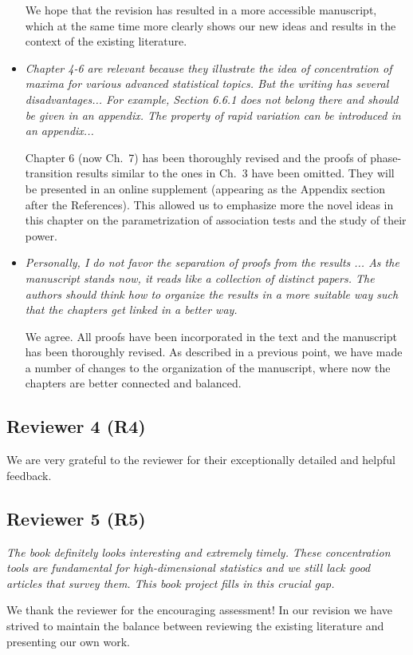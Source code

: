 \documentclass[11pt]{article}
\begin{document}
\begin{itemize}
     We hope that the revision has resulted in a more accessible manuscript, which at the same time more clearly shows our new ideas and results in the
     context of the existing literature.
     
     \item {\em Chapter 4-6 are relevant because they illustrate the idea of concentration of maxima for various advanced statistical topics. But the writing has several disadvantages... For example, Section 6.6.1 does not belong there and should be given in an appendix. The property of rapid variation can be introduced in an appendix...}
     
     Chapter 6 (now Ch.\ 7) has been thoroughly revised and the proofs of phase-transition results similar to the ones in Ch.\ 3 have been omitted.  They
     will be presented in an online supplement (appearing as the Appendix section after the References).  This 
     allowed us to emphasize more the novel ideas in this chapter on the parametrization of association tests and the study of their power.  
     
         
     \item {\em Personally, I do not favor the separation of proofs from the results ... As the manuscript stands now, it reads like a collection of distinct papers. 
     The authors should think how to organize the results in a more suitable way such that the chapters get linked in a better way.}
     
     We agree.  All proofs have been incorporated in the text and the manuscript has been thoroughly revised.  As described in a previous point, we have
     made a number of changes to the organization of the manuscript, where now the chapters are better connected and balanced.
     
     
   \end{itemize}
   
   \subsection{Reviewer 4 (R4)}
   
   We are very grateful to the reviewer for their exceptionally detailed and helpful feedback.  
   
   \subsection{Reviewer 5 (R5)}
   
  {\em The book definitely looks interesting and extremely timely. These concentration tools are fundamental for high-dimensional statistics 
  and we still lack good articles that survey them. This book project fills in this crucial gap.}
  
  
  \bigskip
\noindent   We thank the reviewer for the encouraging assessment!  In our revision we have strived to maintain the balance between reviewing the
   existing literature and presenting our own work.  
   
\end{document}
